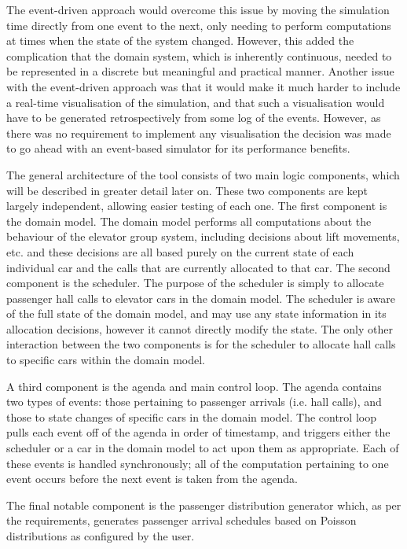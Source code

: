 \documentclass{UoYCSproject}
\begin{document}
The event-driven approach would overcome this issue by moving the simulation time directly from one event to the next, only needing to perform computations at times when the state of the system changed.  However, this added the complication that the domain system, which is inherently continuous, needed to be represented in a discrete but meaningful and practical manner.  Another issue with the event-driven approach was that it would make it much harder to include a real-time visualisation of the simulation, and that such a visualisation would have to be generated retrospectively from some log of the events.  However, as there was no requirement to implement any visualisation the decision was made to go ahead with an event-based simulator for its performance benefits.

The general architecture of the tool consists of two main logic components, which will be described in greater detail later on.  These two components are kept largely independent, allowing easier testing of each one.  The first component is the domain model.  The domain model performs all computations about the behaviour of the elevator group system, including decisions about lift movements, etc. and these decisions are all based purely on the current state of each individual car and the calls that are currently allocated to that car.  The second component is the scheduler.  The purpose of the scheduler is simply to allocate passenger hall calls to elevator cars in the domain model.  The scheduler is aware of the full state of the domain model, and may use any state information in its allocation decisions, however it cannot directly modify the state.  The only other interaction between the two components is for the scheduler to allocate hall calls to specific cars within the domain model.

A third component is the agenda and main control loop.  The agenda contains two types of events: those pertaining to passenger arrivals (i.e. hall calls), and those to state changes of specific cars in the domain model.  The control loop pulls each event off of the agenda in order of timestamp, and triggers either the scheduler or a car in the domain model to act upon them as appropriate.  Each of these events is handled synchronously; all of the computation pertaining to one event occurs before the next event is taken from the agenda.

The final notable component is the passenger distribution generator which, as per the requirements, generates passenger arrival schedules based on Poisson distributions as configured by the user.
\end{document}
